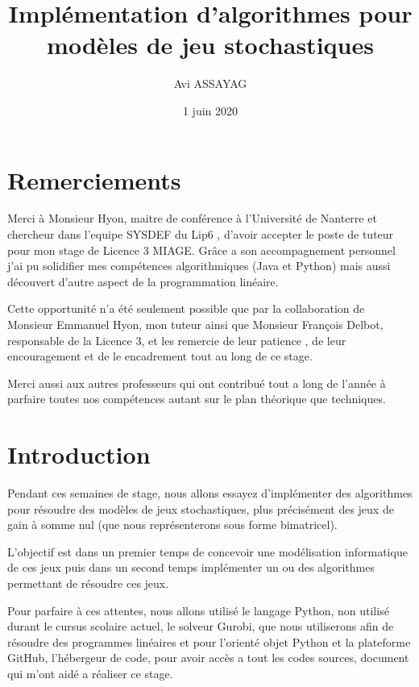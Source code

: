 \documentclass[a4paper, 12pt, twoside]{article}
\author{Avi ASSAYAG}
\title{Implémentation d'algorithmes pour modèles de jeu stochastiques}
\date{1 juin 2020}
\begin{document}
\pagedegarde


\section*{Remerciements}
Merci à Monsieur Hyon, maitre de conférence à l'Université de Nanterre et chercheur dans l'equipe SYSDEF du Lip6 , d'avoir accepter le poste de tuteur pour mon stage de Licence 3 MIAGE. Grâce a son accompagnement personnel j'ai pu solidifier mes compétences algorithmiques (Java et Python) mais aussi découvert d'autre aspect de la programmation linéaire.
\newline 

Cette opportunité n'a été seulement possible que par la collaboration de Monsieur Emmanuel Hyon, mon tuteur ainsi que Monsieur François Delbot, responsable de la Licence 3, et les remercie de leur patience , de leur encouragement et de le encadrement tout au long de ce stage.
\newline

Merci aussi aux autres professeurs qui ont contribué tout a long de l'année à parfaire toutes nos compétences autant sur le plan théorique que techniques. 

\newpage

\tableofcontents
\newpage

\section{Introduction}
Pendant ces semaines de stage, nous allons essayez d'implémenter des algorithmes pour résoudre des modèles de jeux stochastiques, plus précisément des jeux  de gain à somme nul (que nous représenterons sous forme bimatricel). \newline

L'objectif est dans un premier temps de concevoir une modélisation informatique de ces jeux puis dans un second temps implémenter un ou des algorithmes permettant de résoudre ces jeux.  \newline

Pour parfaire à ces attentes, nous allons utilisé le langage \textsf{Python}, non utilisé durant le cursus scolaire actuel, le solveur \textsf{Gurobi}, que nous utiliserons afin de résoudre des programmes linéaires et pour l'orienté objet \textsf{Python} et la plateforme \textsf{GitHub}, l'hébergeur de code, pour avoir accès a tout les codes sources, document qui m'ont aidé a réaliser ce stage. \newline
\end{document}
